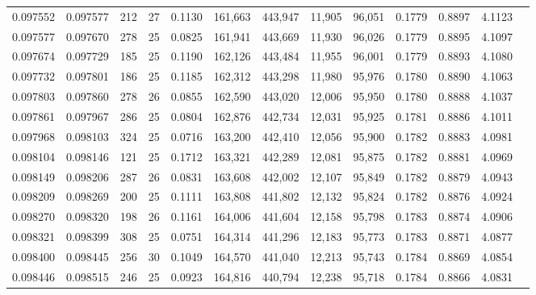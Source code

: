 \begin{tabular}{rrrrrrrrrrrrr}
0.097552 & 0.097577 & 212 &  27 &                                     0.1130 & 161,663 & 443,947 &  11,905 &  96,051 & 0.1779 & 0.8897 & 4.1123 \\
0.097577 & 0.097670 & 278 &  25 &                                     0.0825 & 161,941 & 443,669 &  11,930 &  96,026 & 0.1779 & 0.8895 & 4.1097 \\
0.097674 & 0.097729 & 185 &  25 &                                     0.1190 & 162,126 & 443,484 &  11,955 &  96,001 & 0.1779 & 0.8893 & 4.1080 \\
0.097732 & 0.097801 & 186 &  25 &                                     0.1185 & 162,312 & 443,298 &  11,980 &  95,976 & 0.1780 & 0.8890 & 4.1063 \\
0.097803 & 0.097860 & 278 &  26 &                                     0.0855 & 162,590 & 443,020 &  12,006 &  95,950 & 0.1780 & 0.8888 & 4.1037 \\
0.097861 & 0.097967 & 286 &  25 &                                     0.0804 & 162,876 & 442,734 &  12,031 &  95,925 & 0.1781 & 0.8886 & 4.1011 \\
0.097968 & 0.098103 & 324 &  25 &                                     0.0716 & 163,200 & 442,410 &  12,056 &  95,900 & 0.1782 & 0.8883 & 4.0981 \\
0.098104 & 0.098146 & 121 &  25 &                                     0.1712 & 163,321 & 442,289 &  12,081 &  95,875 & 0.1782 & 0.8881 & 4.0969 \\
0.098149 & 0.098206 & 287 &  26 &                                     0.0831 & 163,608 & 442,002 &  12,107 &  95,849 & 0.1782 & 0.8879 & 4.0943 \\
0.098209 & 0.098269 & 200 &  25 &                                     0.1111 & 163,808 & 441,802 &  12,132 &  95,824 & 0.1782 & 0.8876 & 4.0924 \\
0.098270 & 0.098320 & 198 &  26 &                                     0.1161 & 164,006 & 441,604 &  12,158 &  95,798 & 0.1783 & 0.8874 & 4.0906 \\
0.098321 & 0.098399 & 308 &  25 &                                     0.0751 & 164,314 & 441,296 &  12,183 &  95,773 & 0.1783 & 0.8871 & 4.0877 \\
0.098400 & 0.098445 & 256 &  30 &                                     0.1049 & 164,570 & 441,040 &  12,213 &  95,743 & 0.1784 & 0.8869 & 4.0854 \\
0.098446 & 0.098515 & 246 &  25 &                                     0.0923 & 164,816 & 440,794 &  12,238 &  95,718 & 0.1784 & 0.8866 & 4.0831 \\

\end{tabular}
